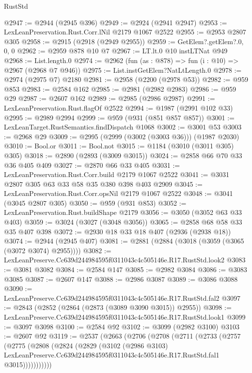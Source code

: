 \begin{lexlean}{RustStd}
\begin{coremodule}
@2947 := @2944 (@2945 @396)
@2949 := @2924 (@2941 @2947)
@2953 := LexLeanPreservation.Rust.Corr.lNil @2179 @1067 @2522
@2955 := @2953 @2807 @305
@2958 := @2915 (@2918 (@2949 @2955))
@2959 := GetElem?.getElem?.{0, 0, 0}
@2962 := @2959 @878 @10 @7
@2967 := LT.lt.{0} @10 instLTNat @949
@2968 := List.length.{0}
@2974 := @2962 (fun (as : @878) => fun (i : @10) => @2967 (@2968 @7 @946))
@2975 := List.instGetElem?NatLtLength.{0}
@2978 := @2974 (@2975 @7) @2180
@2981 := @2958 (@2200 (@2978 @53))
@2982 := @959 @853
@2983 := @2584 @162
@2985 := @2981 (@2982 @2983)
@2986 := @959 @29
@2987 := @2607 @162
@2989 := @2985 (@2986 @2987)
@2991 := LexLeanPreservation.Rust.flagOf @2522
@2994 := @1987 (@2991 @102 @33)
@2995 := @2989 @2994
@2999 := @959 (@931 (@851 @857 @857))
@3001 := LexLeanTarget.RustSemantics.findDispatch @1068
@3002 := @3001 @53
@3003 := @2968 @29
@3009 := @2995 (@2999 (@3002 (@3003 @36))) (@1987 @2030)
@3010 := Bool.or
@3011 := Bool.not
@3015 := @1184 (@3010 (@3011 @305) @305)
@3018 := @2890 (@2893 (@3009 @3015))
@3024 := @2858 @66 @70 @33 @36 @405 @409
@3027 := @2870 @66 @33 @405
@3031 := LexLeanPreservation.Rust.Corr.build @2179 @1067 @2522
@3041 := @3031 @2807 @305 @63 @33 @58 @35 @380 @398 @403 @2909
@3045 := LexLeanPreservation.Rust.Corr.opsNil @2179 @1067 @2522
@3048 := @3041 (@3045 @2807 @305)
@3050 := @959 (@931 @853)
@3052 := LexLeanPreservation.Rust.buildShape @2179
@3056 := @3050 (@3052 @63 @33 @403)
@3059 := @3024 (@3027 (@3048 @3056))
@3065 := @2858 @68 @58 @33 @35 @407 @398
@3072 := @2930 @18 @33 @18 @407 (@2936 (@2938 @18))
@3074 := @2944 (@2945 @407)
@3081 := @2881 (@2884 (@3018 (@3059 (@3065 (@3072 @3074) @2955))))
@3082 := LexLeanPreserve.Cc639d244984595f0311043c4c505146e.R17.RustStd.look2
@3083 := @3081 @3082
@3084 := @2584 @147
@3085 := @2982 @3084
@3086 := @3083 @3085
@3087 := @2607 @147
@3088 := @2986 @3087
@3089 := @3086 @3088
@3090 := LexLeanPreserve.Cc639d244984595f0311043c4c505146e.R17.RustStd.fal2
@3097 := @2843 (@2852 (@2864 (@2873 (@3089 @3090 @3015)) @2955))
@3098 := LexLeanPreserve.Cc639d244984595f0311043c4c505146e.R17.RustStd.look1
@3099 := @3097 @3098
@3100 := @2584 @92
@3102 := @3099 (@2982 @3100)
@3103 := @2607 @92
@3119 := @2537
    (@2663
      (@2706
        (@2708
          (@2711
            (@2733
              (@2757
                (@2775
                  (@2808
                    (@2824
                      (@2829
                        (@3102
                          (@2986 @3103)
                          LexLeanPreserve.Cc639d244984595f0311043c4c505146e.R17.RustStd.fal1
                          @3015)))))))))))

\end{coremodule}
\end{lexlean}
